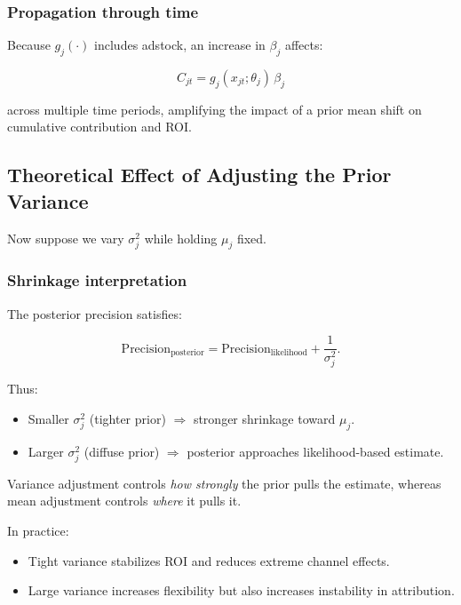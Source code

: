 \documentclass{article}
\begin{document}
\subsubsection*{Propagation through time}

Because $g_j(\cdot)$ includes adstock, an increase in $\beta_j$ affects:

\begin{equation}
C_{jt} = g_j(x_{jt};\theta_j)\,\beta_j
\end{equation}

across multiple time periods, amplifying the impact of a prior mean shift
on cumulative contribution and ROI.

\subsection{Theoretical Effect of Adjusting the Prior Variance}

Now suppose we vary $\sigma_j^2$ while holding $\mu_j$ fixed.

\subsubsection*{Shrinkage interpretation}

The posterior precision satisfies:

\begin{equation}
\text{Precision}_{\text{posterior}} 
=
\text{Precision}_{\text{likelihood}} 
+ \frac{1}{\sigma_j^2}.
\end{equation}

Thus:

\begin{itemize}
\item Smaller $\sigma_j^2$ (tighter prior) $\Rightarrow$ stronger shrinkage toward $\mu_j$.
\item Larger $\sigma_j^2$ (diffuse prior) $\Rightarrow$ posterior approaches likelihood-based estimate.
\end{itemize}

Variance adjustment controls \emph{how strongly} the prior pulls the estimate,
whereas mean adjustment controls \emph{where} it pulls it.

In practice:

\begin{itemize}
\item Tight variance stabilizes ROI and reduces extreme channel effects.
\item Large variance increases flexibility but also increases instability in attribution.
\end{itemize}
\end{document}
